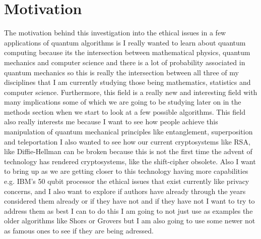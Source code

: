 \documentclass{article}
\begin{document}
\section{Motivation}
The motivation behind this investigation into the ethical issues in a few applications of quantum algorithms is I really wanted to learn about quantum computing because its  the intersection between mathematical physics, quantum mechanics and computer science and there is a lot of probability associated in quantum mechanics so this is really the intersection between all three of my disciplines that I am currently studying those being mathematics, statistics and computer science. Furthermore, this field is a really new and interesting field with many implications some of which we are going to be studying later on in the methods section when we start to look at a few possible algorithms. This field also really interests me because I  want to see how people achieve this manipulation of quantum mechanical principles like entanglement, superposition and teleportation I also wanted to see how our current cryptosystems like RSA, like Diffie-Hellman can be broken because this is not the first time the advent of technology has rendered cryptosystems, like the shift-cipher obsolete. Also I want to bring up as we are getting closer to this technology having more capabilities e.g. IBM's 50 qubit processor \cite{IBM} the ethical issues that exist currently like privacy concerns, and I also want to explore if authors have already through the years considered them already or if they have not and if they have not I want to try to address them as best I can to do this I am going to not just use as examples the older algorithms like Shors or Grovers but I am also going to use some newer not as famous ones to see if they are being adressed.        
\end{document}
